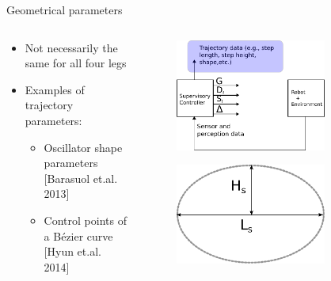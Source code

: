 \documentclass[10pt]{beamer}
\begin{document}
\begin{frame}{Geometrical parameters}
		\begin{columns}
		\hspace{1cm}
		\begin{column}{0.5\textwidth}
		
		\begin{itemize}
			\setlength\itemsep{3em}
			\item Not necessarily the same for all four legs
			\item Examples of trajectory parameters:
			\begin{itemize}
			\item Oscillator shape parameters [Barasuol et.al. 2013]
			\item Control points of a Bézier curve [Hyun et.al. 2014]
			\end{itemize}
			
		
		\end{itemize}	
		
		\end{column}
		\begin{column}{0.5\textwidth}
			\begin{figure}[ht]\centering
				\includegraphics[width=0.75\textwidth]{images/Supervisory.pdf}
			\end{figure}
			\begin{figure}[ht]\centering
				\includegraphics[width=0.75\textwidth]{images/PrimitiveShape.pdf}
			\end{figure}	
		\end{column}
		\end{columns}
	\end{frame}
\end{document}
